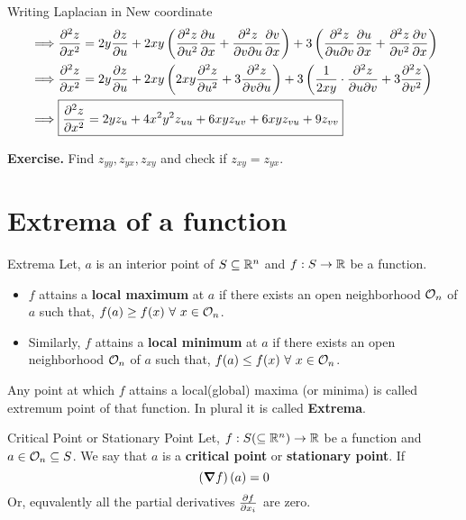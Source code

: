 \documentclass[../Analysis-3.tex]{subfiles}
\begin{document}
\begin{Eg}{Writing Laplacian in New coordinate}{}
\begin{align*}
        \implies     & \pdv[2]{z}{x} = 2y \pdv{z}{u} + 2xy \left(\pdv[2]{z}{u} \pdv{u}{x} + \pdv{z}{v}{u} \pdv{v}{x}\right)  + 3\left( \pdv{z}{u}{v} \pdv{u}{x} + \pdv[2]{z}{v} \pdv{v}{x}\right)                                                                                  \\
        \implies     & \pdv[2]{z}{x} = 2y \pdv{z}{u} + 2xy \left(2xy \pdv[2]{z}{u}  + 3 \pdv{z}{v}{u}\right)  + 3\left( \frac{1}{2xy}\cdot\pdv{z}{u}{v}  + 3\pdv[2]{z}{v}\right)                                                                                                   \\
        \implies     & \boxed{\pdv[2]{z}{x} = 2y z_u + 4x^2y^2z_{uu}+ 6xy z_{uv} + 6xy z_{vu} + 9z_{vv}}
    \end{align*}

\end{Eg}

\textbf{Exercise.} Find $z_{yy}, z_{yx}, z_{xy}$ and check if $z_{xy} = z_{yx}$.

\section{Extrema of a function}

\begin{Def}{Extrema}{}
    Let, $a$ is an interior point of $S \subseteq \mathbb{R}^n$ and $f : S \to \mathbb{R}$ be a function.

    \begin{itemize}
        \item $f$ attains a \textbf{local maximum} at $a$ if there exists an open neighborhood $\mathcal{O}_{n}$ of $a$ such that, $f(a) \geq f(x)\ \forall\ x \in \mathcal{O}_{n}$.
        \item Similarly, $f$ attains a \textbf{local minimum} at $a$ if there exists an open neighborhood $\mathcal{O}_{n}$ of $a$ such that, $f(a) \leq f(x)\ \forall\ x \in \mathcal{O}_{n}$.
    \end{itemize}

    Any point at which $f$ attains a local(global) maxima (or minima)  is called extremum point of that function. In plural it is called \textbf{Extrema}.
\end{Def}

\begin{Def}{Critical Point or Stationary Point}{}
    Let, $f : S (\subseteq \mathbb{R}^n) \to \mathbb{R}$ be a function and $a \in \mathcal{O}_{n} \subseteq S$. We say that $a$ is a \textbf{critical point} or \textbf{stationary point}.
    If \[ \left(\grad f\right)(a) = 0\]
    Or, equvalently all the partial derivatives $\pdv{f}{x_i}$ are zero.
\end{Def}
\end{document}
